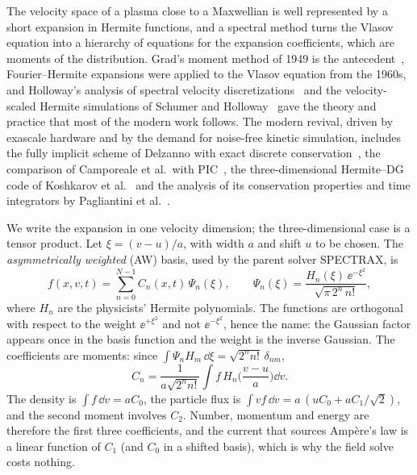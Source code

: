 The velocity space of a plasma close to a Maxwellian is well represented by a short expansion in Hermite functions, and a spectral method turns the Vlasov equation into a hierarchy of equations for the expansion coefficients, which are moments of the distribution. Grad's moment method of 1949 is the antecedent~\citep{Grad1949}, Fourier--Hermite expansions were applied to the Vlasov equation from the 1960s, and Holloway's analysis of spectral velocity discretizations~\citep{Holloway1996} and the velocity-scaled Hermite simulations of Schumer and Holloway~\citep{SchumerHolloway1998} gave the theory and practice that most of the modern work follows. The modern revival, driven by exascale hardware and by the demand for noise-free kinetic simulation, includes the fully implicit scheme of Delzanno with exact discrete conservation~\citep{Delzanno2015}, the comparison of Camporeale et al.\ with PIC~\citep{Camporeale2016}, the three-dimensional Hermite--DG code of Koshkarov et al.~\citep{Koshkarov2021} and the analysis of its conservation properties and time integrators by Pagliantini et al.~\citep{Pagliantini2023a}.

We write the expansion in one velocity dimension; the three-dimensional case is a tensor product. Let $\xi=(v-u)/a$, with width $a$ and shift $u$ to be chosen. The \emph{asymmetrically weighted} (AW) basis, used by the parent solver SPECTRAX, is
\begin{equation}
f(x,v,t)=\sum_{n=0}^{N-1}C_n(x,t)\,\Psi_n(\xi),\qquad \Psi_n(\xi)=\frac{H_n(\xi)\,\ee^{-\xi^2}}{\sqrt{\pi\,2^n\,n!}} ,\label{eq:AW}
\end{equation}
where $H_n$ are the physicists' Hermite polynomials. The functions are orthogonal with respect to the weight $\ee^{+\xi^2}$ and not $\ee^{-\xi^2}$, hence the name: the Gaussian factor appears once in the basis function and the weight is the inverse Gaussian. The coefficients are moments: since $\int\Psi_nH_m\,\dd\xi=\sqrt{2^nn!}\,\delta_{nm}$,
\begin{equation}
C_n=\frac{1}{a\sqrt{2^nn!}}\int f\,H_n\!\Big(\frac{v-u}{a}\Big)\dd v .
\end{equation}
The density is $\int f\,\dd v=aC_0$, the particle flux is $\int vf\,\dd v=a\,(uC_0+aC_1/\sqrt2)$, and the second moment involves $C_2$. Number, momentum and energy are therefore the first three coefficients, and the current that sources Amp\`ere's law is a linear function of $C_1$ (and $C_0$ in a shifted basis), which is why the field solve costs nothing.

